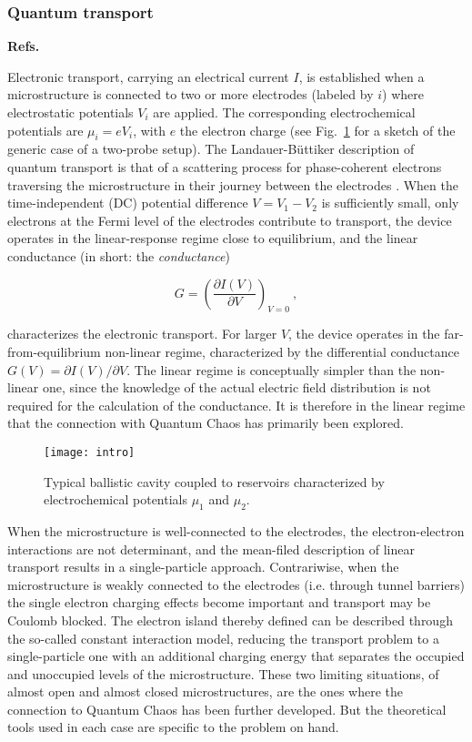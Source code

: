 \documentclass[a4paper,10pt]{article}
\newcommand{\nin}{\noindent}
\newcommand{\be}{\begin{equation}}
\newcommand{\ee}{\end{equation}}
\begin{document}
\subsubsection{Quantum transport}

{\bf Refs.~\cite{landauer87,buttiker88,CBrev,buttiker93}}

\nin Electronic transport, carrying an electrical current $I$, is established when a microstructure is connected to two or more electrodes (labeled by $i$) where electrostatic potentials $V_i$ are applied. The corresponding electrochemical potentials are $\mu_i = e V_i$, with $e$ the electron charge (see Fig.~\ref{fig:intro} for a sketch of the generic case of a two-probe setup). The Landauer-B\"uttiker description of quantum transport is that of a scattering process for phase-coherent electrons traversing the microstructure in their journey between the electrodes \cite{Land70,Butt86}. When the time-independent (DC) potential difference $V=V_1-V_2$ is sufficiently small, only electrons at the Fermi level of the electrodes contribute to transport, the device operates in the linear-response regime close to equilibrium, and the linear conductance (in short: the {\it conductance}) 

\be
G = \left(\frac{\partial I(V)}{\partial V}\right)_{V=0} \ ,
\ee 

\nin characterizes the electronic transport. For larger $V$, the device operates  in the far-from-equilibrium non-linear regime, characterized by the differential conductance $G(V)=\partial I(V)/\partial V$. The linear regime is conceptually simpler than the non-linear one, since the knowledge of the actual electric field distribution is not required for the calculation of the conductance. It is therefore in the linear regime that the connection with Quantum Chaos has primarily been explored. 

\begin{figure}
\setlength{\unitlength}{1mm}
\centerline{\texttt{[image: intro]}}
\caption{Typical ballistic cavity coupled to reservoirs 
characterized by electrochemical potentials $\mu_1$ and $\mu_2$.}
\label{fig:intro}
\end{figure}

\nin When the microstructure is well-connected to the electrodes, the electron-electron interactions are not determinant, and the mean-filed description of linear transport results in a single-particle approach. Contrariwise, when the microstructure is weakly connected to the electrodes (i.e. through tunnel barriers) the single electron charging effects become important and transport may be Coulomb blocked. The electron island thereby defined can be described through the so-called constant interaction model, reducing the transport problem to a single-particle one with an additional charging energy that separates the occupied and unoccupied levels of the microstructure. These two limiting situations, of almost open and almost closed microstructures, are the ones where the connection to Quantum Chaos has been further developed. But the theoretical tools used in each case are specific to the problem on hand.
\end{document}
